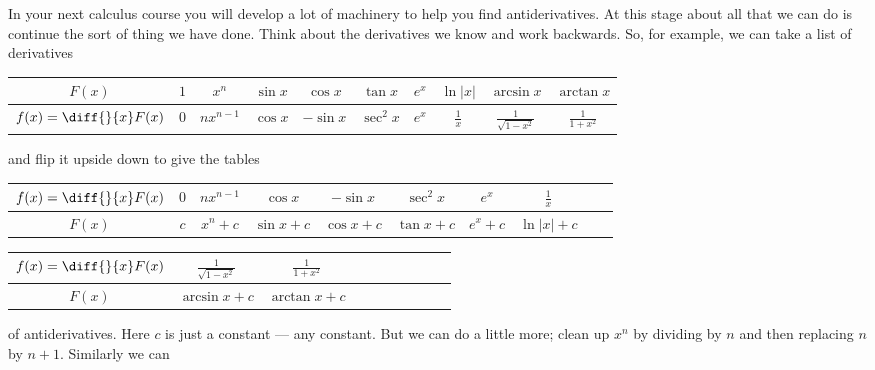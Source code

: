 In your next calculus course you will develop a lot of machinery
to help you find antiderivatives. At this stage about all that we can
do is continue the sort of thing we have done. Think about the derivatives we know and
work backwards. So, for example, we can take a list of derivatives
\renewcommand{\arraystretch}{1.3}
\begin{center}
     \begin{tabular}{|c||c|c|c|c|c|c|c|c|c|}
          \hline
                  $F(x)$ &   $1$ &  $x^n$ & $\sin x$ & $\cos x$
                  & $\tan x$ & $e^x$ & $\ln |x|$
                  & $\arcsin x$ & $\arctan x$
           \\ \hline
                  $f(x)=\diff{}{x}F(x)$ & $0$ & $nx^{n-1}$ & $\cos x$
                  & $-\sin x$
                  &  $\sec^2 x$ & $e^x$ & $\frac{1}{x}$
                  & $\frac{1}{\sqrt{1-x^2}}$ & $\frac{1}{1+x^2}$
           \\ \hline
     \end{tabular}
\end{center}
\renewcommand{\arraystretch}{1.0}
and flip it upside down to give the tables
\renewcommand{\arraystretch}{1.3}
\begin{center}
     \begin{tabular}{|c||c|c|c|c|c|c|c|c|c|}
          \hline
                  $f(x)=\diff{}{x}F(x)$ & $0$ & $nx^{n-1}$ & $\cos x$
                  & $-\sin x$
                  &  $\sec^2 x$ & $e^x$ & $\frac{1}{x}$
           \\ \hline
                  $F(x)$ &   $c$ &  $x^n+c$ & $\sin x+c$ & $\cos x+c$
                  & $\tan x+c$ & $e^x+c$ & $\ln |x|+c$
           \\ \hline
     \end{tabular}
\end{center}
\begin{center}
     \begin{tabular}{|c||c|c|c|c|c|c|c|c|c|}
          \hline
                  $f(x)=\diff{}{x}F(x)$
                  & $\frac{1}{\sqrt{1-x^2}}$ & $\frac{1}{1+x^2}$
           \\ \hline
                  $F(x)$
                  & $\arcsin x+c$ & $\arctan x+c$
           \\ \hline
     \end{tabular}
\end{center}
\renewcommand{\arraystretch}{1.0}
of antiderivatives. Here $c$ is just a constant --- any constant. But we can do
a little
more; clean up $x^n$ by dividing by $n$ and then replacing $n$ by $n+1$. Similarly we can
